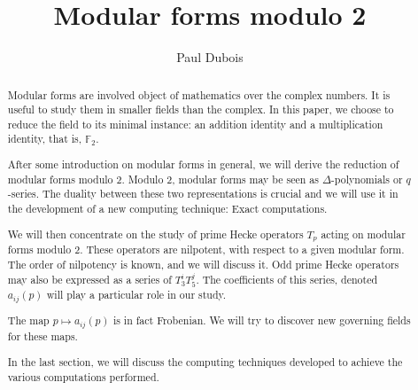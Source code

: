 \documentclass[a4paper, 11pt]{article}
\title{Modular forms modulo 2}
\author{Paul Dubois}
\newcommand{\F}{\mathbb{F}}
\begin{document}
	\maketitle
	\begin{abstract}
		Modular forms are involved object of mathematics over the complex numbers.
		It is useful to study them in smaller fields than the complex. In this paper, we choose to reduce the field to its minimal instance: an addition identity and a multiplication identity, that is, $\F_2$.
		
		After some introduction on modular forms in general, we will derive the reduction of modular forms modulo 2. Modulo 2, modular forms may be seen as $\Delta$-polynomials or $q$-series. The duality between these two representations is crucial and we will use it in the development of a new computing technique: Exact computations.
		
		We will then concentrate on the study of prime Hecke operators $T_p$ acting on modular forms modulo 2.
		These operators are nilpotent, with respect to a given modular form.
		The order of nilpotency is known, and we will discuss it.
		Odd prime Hecke operators may also be expressed as a series of $T_3^iT_5^j$.
		The coefficients of this series, denoted $a_{ij}(p)$ will play a particular role in our study.
		
		The map $p \mapsto a_{ij}(p)$ is in fact Frobenian.
		We will try to discover new governing fields for these maps.
		
		In the last section, we will discuss the computing techniques developed to achieve the various computations performed.
	\end{abstract}
	\tableofcontents
	
	
	
	
	
	
	\appendix
	
	
	
	
	
\end{document}
